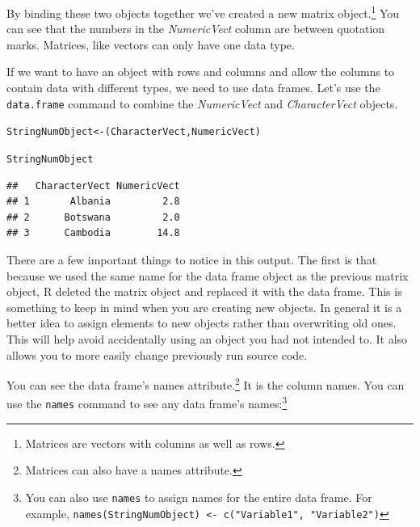 \documentclass[krantz1]{krantz}
\begin{document}
\noindent By binding these two objects together we've created a new matrix object.\footnote{Matrices are vectors with columns as well as rows.} You can see that the numbers in the {\emph{NumericVect}} column are between quotation marks. Matrices, like vectors can only have one data type. \\[0.25cm]


If we want to have an object with rows and columns and allow the columns to contain data with different types, we need to use data frames. Let's use the \texttt{data.frame} command to combine the {\emph{NumericVect}} and {\emph{CharacterVect}} objects.\label{data.frame}

\begin{knitrout}
\color{fgcolor}\begin{kframe}
\begin{alltt}
StringNumObject <- (CharacterVect, NumericVect)

StringNumObject
\end{alltt}
\begin{verbatim}
##   CharacterVect NumericVect
## 1       Albania         2.8
## 2      Botswana         2.0
## 3      Cambodia        14.8
\end{verbatim}
\end{kframe}
\end{knitrout}


\noindent There are a few important things to notice in this output. The first is that because we used the same name for the data frame object as the previous matrix object, R deleted the matrix object and replaced it with the data frame. This is something to keep in mind when you are creating new objects. In general it is a better idea to assign elements to new objects rather than overwriting old ones. This will help avoid accidentally using an object you had not intended to. It also allows you to more easily change previously run source code.

You can see the data frame's names attribute.\footnote{Matrices can also have a names attribute.} It is the column names. You can use the \texttt{names} command to see any data frame's names:\footnote{You can also use \texttt{names} to assign names for the entire data frame. For example, \texttt{names(StringNumObject) <- c("Variable1", "Variable2")}}
\end{document}
